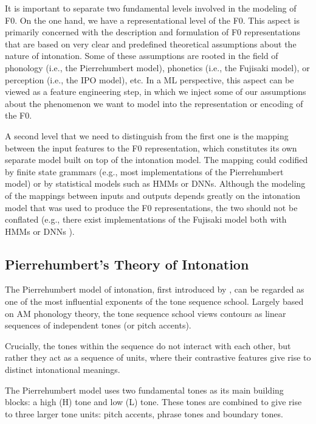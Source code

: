 It is important to separate two fundamental levels involved in the modeling of \ac{F0}.
On the one hand, we have a representational level of the \ac{F0}.
This aspect is primarily concerned with the description and formulation of \ac{F0} representations that are based on very clear and predefined theoretical assumptions about the nature of intonation.
Some of these assumptions are rooted in the field of phonology (i.e., the Pierrehumbert model), phonetics (i.e., the Fujisaki model), or perception (i.e., the IPO model), etc.
In a \ac{ML} perspective, this aspect can be viewed as a feature engineering step, in which we inject some of our assumptions about the phenomenon we want to model into the representation or encoding of the \ac{F0}.

A second level that we need to distinguish from the first one is the mapping between the input features to the \ac{F0} representation, which constitutes its own separate model built on top of the intonation model.
The mapping could codified by finite state grammars (e.g., most implementations of the Pierrehumbert model) or by statistical models such as \acp{HMM} or \acp{DNN}.
Although the modeling of the mappings between inputs and outputs depends greatly on the intonation model that was used to produce the \ac{F0} representations, the two should not be conflated (e.g., there exist implementations of the Fujisaki model both with \acp{HMM} \citep{Yoshizato2012Statistical} or \acp{DNN} \citep{Sakurai2000Data}).



\subsection{Pierrehumbert’s Theory of Intonation}

The Pierrehumbert model of intonation, first introduced by \citet{Pierrehumbert1980phonetics}, can be regarded as one of the most influential exponents of the tone sequence school.
Largely based on \ac{AM} phonology theory, the tone sequence school views contours as linear sequences of independent tones (or pitch accents).

Crucially, the tones within the sequence do not interact with each other, but rather they act as a sequence of units, where their contrastive features give rise to distinct intonational meanings.

The Pierrehumbert model uses two fundamental tones as its main building blocks: a high (H) tone and low (L) tone.
These tones are combined to give rise to three larger tone units: pitch accents, phrase tones and boundary tones.

